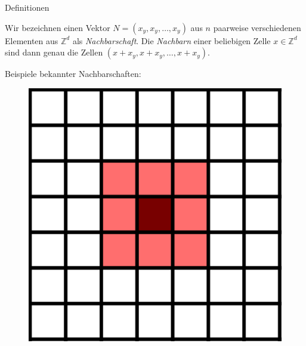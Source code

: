 \documentclass[aspectratio=169]{beamer}
\begin{document}
  \begin{frame}{Definitionen}
    \begin{definition*}[Nachbarschaft]
      Wir bezeichnen einen Vektor $N = (x_y, x_y, \dots, x_y)$ aus $n$ paarweise verschiedenen Elementen aus $\mathbb{Z}^d$ als \textit{Nachbarschaft}. Die \textit{Nachbarn} einer beliebigen Zelle $x \in \mathbb{Z}^d$ sind dann genau die Zellen $(x + x_y, x + x_y, \dots, x + x_y)$.
    \end{definition*}

    Beispiele bekannter Nachbarschaften:

    \begin{multicols*}{2}
      \begin{multicols*}{2}
        \begin{figure}[H]
          \centering
          \includegraphics[width = 0.28 \textheight]{moore_1.png}
        \end{figure}


\end{multicols*}
\end{multicols*}
\end{frame}
\end{document}
